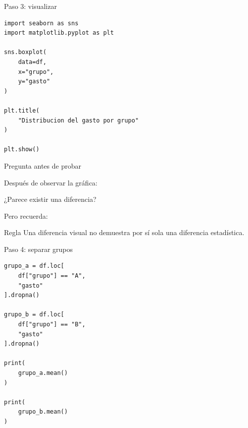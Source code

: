 \documentclass[aspectratio=169,11pt]{beamer}
\begin{document}

\begin{frame}[fragile]{Paso 3: visualizar}

\begin{lstlisting}
import seaborn as sns
import matplotlib.pyplot as plt

sns.boxplot(
    data=df,
    x="grupo",
    y="gasto"
)

plt.title(
    "Distribucion del gasto por grupo"
)

plt.show()
\end{lstlisting}

\end{frame}


\begin{frame}{Pregunta antes de probar}

Después de observar la gráfica:

\begin{center}

\Large
¿Parece existir una diferencia?
\end{center}

\vspace{0.5cm}

Pero recuerda:

\begin{alertblock}{Regla}
Una diferencia visual no demuestra por sí sola una diferencia estadística.
\end{alertblock}

\end{frame}


\begin{frame}[fragile]{Paso 4: separar grupos}

\begin{lstlisting}
grupo_a = df.loc[
    df["grupo"] == "A",
    "gasto"
].dropna()

grupo_b = df.loc[
    df["grupo"] == "B",
    "gasto"
].dropna()

print(
    grupo_a.mean()
)

print(
    grupo_b.mean()
)
\end{lstlisting}

\end{frame}

\end{document}
